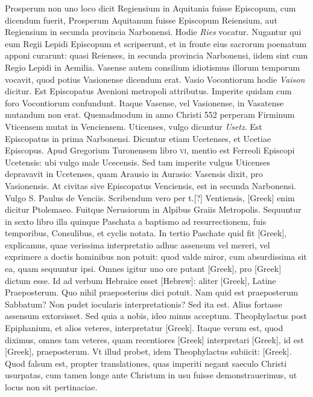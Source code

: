 Prosperum non uno
loco dicit Regiensium in Aquitania fuisse Episcopum, cum dicendum
fuerit, Prosperum Aquitanum fuisse Episcopum Reiensium,
aut Regiensium in secunda provincia Narbonensi.
Hodie \textit{Ries} vocatur.
Nugantur qui eum Regii Lepidi Episcopum et scripserunt,
et in fronte eius sacrorum poematum apponi curarunt: quasi Reienses,
in secunda provincia Narbonensi, iidem sint cum Regio Lepidi
in Aemilia.
Vasense autem consilium idiotismus illorum temporum
vocavit, quod potius Vasionense dicendum erat.
Vasio Vocontiorum hodie \textit{Vaison} dicitur.
Est Episcopatus Avenioni metropoli
attributus.
Imperite quidam cum foro Vocontiorum confundunt.
Itaque Vasense, vel Vasionense, in Vasatense mutandum non
erat.
Quemadmodum in anno Christi 552 perperam Firminum
Vticensem mutat in Venciensem.
Uticenses, vulgo dicuntur \textit{Usetz}.
Est Episcopatus in prima Narbonensi.
Dicuntur etiam Ucetenses,
et Ucetiae Episcopus.
Apud Gregorium Turonensem libro \textsc{vi},
mentio est Ferreoli Episcopi Ucetensis: ubi vulgo male Ucecensis.
Sed tam imperite vulgus Uticenses depravavit in Ucetenses, quam
Arausio in Aurasio: Vasensis dixit, pro Vasionensis.
At civitas sive
Episcopatus Venciensis, est in secunda Narbonensi. Vulgo S. Paulus
de Venciis.
Scribendum vero per t.[?] Ventiensis, \textgreek{[Greek]} enim dicitur
Ptolemaeo.
Fuitque Nerusiorum in Alpibus Graiis Metropolis.
Sequuntur in sexto libro illa quinque Paschata a baptismo
ad resurrectionem, fuis temporibus, Consulibus, et cyclis notata.
In tertio Paschate quid fit \textgreek{[Greek]}, explicamus,
quae verissima interpretatio adhuc assensum vel mereri, vel
exprimere a doctis hominibus non potuit: quod valde miror,
cum absurdissima sit ea, quam sequuntur ipsi.
Omnes igitur uno
ore putant \textgreek{[Greek]}, pro \textgreek{[Greek]} dictum esse.
Id ad verbum
Hebraice esset \texthebrew{[Hebrew]}:
 aliter \textgreek{[Greek]}, Latine Praeposterum.
Quo nihil praeposterius dici potuit.
Nam quid est praeposterum Sabbatum?
Non pudet iocularis interpretationis?
Sed ita est.
Alius fortasse assensum extorsisset.
Sed quia a nobis, ideo
minus acceptum.
Theophylactus post Epiphanium, et alios veteres,
interpretatur \textgreek{[Greek]}.
Itaque verum est, quod diximus, omnes tam veteres, quam
recentiores \textgreek{[Greek]} interpretari
 \textgreek{[Greek]}, id est \textgreek{[Greek]},
praeposterum.
Vt illud probet, idem Theophylactus
subiicit: \textgreek{[Greek]}.
Quod falsum est,
propter translationes, quas imperiti negant saeculo Christi usurpatas,
cum tamen longe ante Christum in usu fuisse demonstrauerimus,
ut locus non sit pertinaciae.

